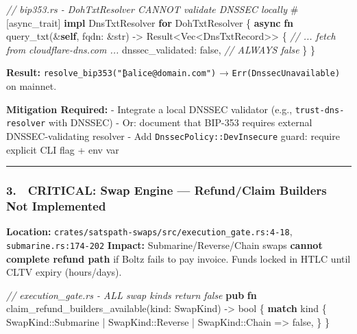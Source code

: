 \documentclass[
]{article}
\newenvironment{Shaded}{}{}
\newcommand{\AttributeTok}[1]{\textcolor[rgb]{0.49,0.56,0.16}{#1}}
\newcommand{\CommentTok}[1]{\textcolor[rgb]{0.38,0.63,0.69}{\textit{#1}}}
\newcommand{\ConstantTok}[1]{\textcolor[rgb]{0.53,0.00,0.00}{#1}}
\newcommand{\ControlFlowTok}[1]{\textcolor[rgb]{0.00,0.44,0.13}{\textbf{#1}}}
\newcommand{\DataTypeTok}[1]{\textcolor[rgb]{0.56,0.13,0.00}{#1}}
\newcommand{\KeywordTok}[1]{\textcolor[rgb]{0.00,0.44,0.13}{\textbf{#1}}}
\newcommand{\NormalTok}[1]{#1}
\newcommand{\OperatorTok}[1]{\textcolor[rgb]{0.40,0.40,0.40}{#1}}
\newcommand{\PreprocessorTok}[1]{\textcolor[rgb]{0.74,0.48,0.00}{#1}}
\begin{document}
\begin{Shaded}
\begin{Highlighting}[]
\CommentTok{// bip353.rs {-} DohTxtResolver CANNOT validate DNSSEC locally}
\AttributeTok{\#[}\NormalTok{async\_trait}\AttributeTok{]}
\KeywordTok{impl}\NormalTok{ DnsTxtResolver }\ControlFlowTok{for}\NormalTok{ DohTxtResolver }\OperatorTok{\{}
    \KeywordTok{async} \KeywordTok{fn}\NormalTok{ query\_txt(}\OperatorTok{\&}\KeywordTok{self}\OperatorTok{,}\NormalTok{ fqdn}\OperatorTok{:} \OperatorTok{\&}\DataTypeTok{str}\NormalTok{) }\OperatorTok{{-}\textgreater{}} \DataTypeTok{Result}\OperatorTok{\textless{}}\DataTypeTok{Vec}\OperatorTok{\textless{}}\NormalTok{DnsTxtRecord}\OperatorTok{\textgreater{}\textgreater{}} \OperatorTok{\{}
        \CommentTok{// ... fetch from cloudflare{-}dns.com ...}
\NormalTok{        dnssec\_validated}\OperatorTok{:} \ConstantTok{false}\OperatorTok{,}  \CommentTok{// ALWAYS false}
    \OperatorTok{\}}
\OperatorTok{\}}
\end{Highlighting}
\end{Shaded}

\textbf{Result:} \texttt{resolve\_bip353("₿alice@domain.com")} →
\texttt{Err(DnssecUnavailable)} on mainnet.

\textbf{Mitigation Required:} - Integrate a local DNSSEC validator
(e.g., \texttt{trust-dns-resolver} with DNSSEC) - Or: document that
BIP-353 requires external DNSSEC-validating resolver - Add
\texttt{DnssecPolicy::DevInsecure} guard: require explicit CLI flag +
env var

\begin{center}\rule{0.5\linewidth}{0.5pt}\end{center}

\hypertarget{critical-swap-engine-refundclaim-builders-not-implemented}{%
\subsubsection{3. 🔴 CRITICAL: Swap Engine --- Refund/Claim Builders Not
Implemented}\label{critical-swap-engine-refundclaim-builders-not-implemented}}

\textbf{Location:}
\texttt{crates/satspath-swaps/src/execution\_gate.rs:4-18},
\texttt{submarine.rs:174-202} \textbf{Impact:} Submarine/Reverse/Chain
swaps \textbf{cannot complete refund path} if Boltz fails to pay
invoice. Funds locked in HTLC until CLTV expiry (hours/days).

\begin{Shaded}
\begin{Highlighting}[]
\CommentTok{// execution\_gate.rs {-} ALL swap kinds return false}
\KeywordTok{pub} \KeywordTok{fn}\NormalTok{ claim\_refund\_builders\_available(kind}\OperatorTok{:}\NormalTok{ SwapKind) }\OperatorTok{{-}\textgreater{}} \DataTypeTok{bool} \OperatorTok{\{}
    \ControlFlowTok{match}\NormalTok{ kind }\OperatorTok{\{}
        \PreprocessorTok{SwapKind::}\NormalTok{Submarine }\OperatorTok{|} \PreprocessorTok{SwapKind::}\NormalTok{Reverse }\OperatorTok{|} \PreprocessorTok{SwapKind::}\NormalTok{Chain }\OperatorTok{=\textgreater{}} \ConstantTok{false}\OperatorTok{,}
    \OperatorTok{\}}
\OperatorTok{\}}
\end{Highlighting}
\end{Shaded}
\end{document}
